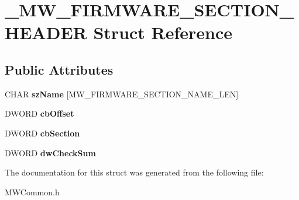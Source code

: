 \hypertarget{struct__MW__FIRMWARE__SECTION__HEADER}{\section{\-\_\-\-M\-W\-\_\-\-F\-I\-R\-M\-W\-A\-R\-E\-\_\-\-S\-E\-C\-T\-I\-O\-N\-\_\-\-H\-E\-A\-D\-E\-R Struct Reference}
\label{struct__MW__FIRMWARE__SECTION__HEADER}
}
\subsection*{Public Attributes}
\begin{DoxyCompactItemize}
\item 
\hypertarget{struct__MW__FIRMWARE__SECTION__HEADER_a9655a7f7ba3df1975bef94c290e1a7d3}{C\-H\-A\-R {\bfseries sz\-Name} \mbox{[}M\-W\-\_\-\-F\-I\-R\-M\-W\-A\-R\-E\-\_\-\-S\-E\-C\-T\-I\-O\-N\-\_\-\-N\-A\-M\-E\-\_\-\-L\-E\-N\mbox{]}}\label{struct__MW__FIRMWARE__SECTION__HEADER_a9655a7f7ba3df1975bef94c290e1a7d3}

\item 
\hypertarget{struct__MW__FIRMWARE__SECTION__HEADER_a3d1ad1c54d26eaca23c4898b5a135fef}{D\-W\-O\-R\-D {\bfseries cb\-Offset}}\label{struct__MW__FIRMWARE__SECTION__HEADER_a3d1ad1c54d26eaca23c4898b5a135fef}

\item 
\hypertarget{struct__MW__FIRMWARE__SECTION__HEADER_a08d89b5ac6d0628944035f04c66dc669}{D\-W\-O\-R\-D {\bfseries cb\-Section}}\label{struct__MW__FIRMWARE__SECTION__HEADER_a08d89b5ac6d0628944035f04c66dc669}

\item 
\hypertarget{struct__MW__FIRMWARE__SECTION__HEADER_a4bb89172daa347f34f1180ce5b8b9ea5}{D\-W\-O\-R\-D {\bfseries dw\-Check\-Sum}}\label{struct__MW__FIRMWARE__SECTION__HEADER_a4bb89172daa347f34f1180ce5b8b9ea5}

\end{DoxyCompactItemize}


The documentation for this struct was generated from the following file\-:\begin{DoxyCompactItemize}
\item 
M\-W\-Common.\-h\end{DoxyCompactItemize}
